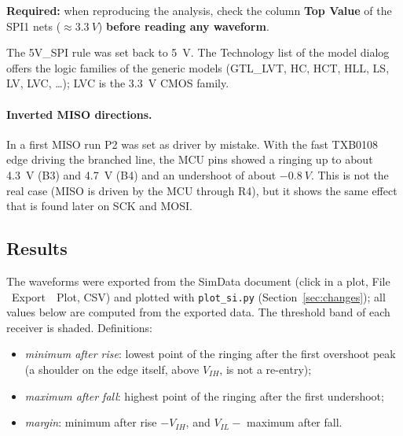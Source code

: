 \documentclass[11pt,a4paper]{article}
\newcommand{\required}[1]{\begin{reqbox}\textbf{\color{reqred}Required:} #1\end{reqbox}}
\newcommand{\gui}[1]{\textsf{#1}}
\newcommand{\m}{\,\guillemotright\ }
\begin{document}
\required{when reproducing the analysis, check the column \textbf{Top Value} of the SPI1 nets
($\approx\qty{3.3}{V}$) \textbf{before reading any waveform}.}

The 5V\_SPI rule was set back to \qty{5}{V}. The Technology list of the model dialog offers the
logic families of the generic models (GTL\_LVT, HC, HCT, HLL, LS, LV, LVC, \dots); LVC is the
\qty{3.3}{V} CMOS family.

\paragraph{Inverted MISO directions.} In a first MISO run P2 was set as driver by mistake. With the
fast TXB0108 edge driving the branched line, the MCU pins showed a ringing up to about \qty{4.3}{V}
(B3) and \qty{4.7}{V} (B4) and an undershoot of about $-\qty{0.8}{V}$. This is not the real case (MISO is
driven by the MCU through R4), but it shows the same effect that is found later on SCK and
MOSI.

\subsection{Results}\label{sec:results}

The waveforms were exported from the SimData document (click in a plot, \gui{File \m Export \m Plot},
CSV) and plotted with \texttt{plot\_si.py} (Section~\ref{sec:changes}); all values below are computed from the exported
data. The threshold band of each receiver is shaded. Definitions:
\begin{itemize}[nosep]
    \item \textit{minimum after rise}: lowest point of the ringing after the first overshoot peak (a shoulder
    on the edge itself, above $V_{IH}$, is not a re-entry);
    \item \textit{maximum after fall}: highest point of the ringing after the first undershoot;
    \item \textit{margin}: minimum after rise $-V_{IH}$, and $V_{IL}-$ maximum after fall.
\end{itemize}
\end{document}
